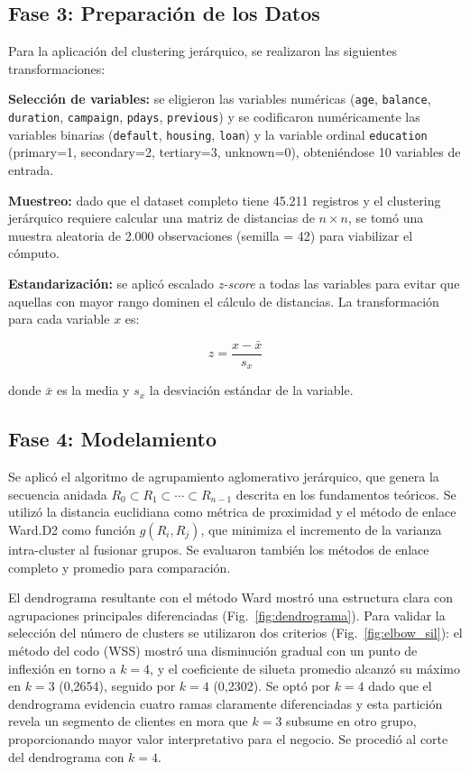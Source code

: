 \documentclass[10pt,a4paper]{article}
\begin{document}
\subsection{Fase 3: Preparación de los Datos}

Para la aplicación del clustering jerárquico, se realizaron las siguientes transformaciones:

\textbf{Selección de variables:} se eligieron las variables numéricas (\texttt{age}, \texttt{balance}, \texttt{duration}, \texttt{campaign}, \texttt{pdays}, \texttt{previous}) y se codificaron numéricamente las variables binarias (\texttt{default}, \texttt{housing}, \texttt{loan}) y la variable ordinal \texttt{education} (primary=1, secondary=2, tertiary=3, unknown=0), obteniéndose 10 variables de entrada.

\textbf{Muestreo:} dado que el dataset completo tiene 45.211 registros y el clustering jerárquico requiere calcular una matriz de distancias de $n \times n$, se tomó una muestra aleatoria de 2.000 observaciones (semilla = 42) para viabilizar el cómputo.

\textbf{Estandarización:} se aplicó escalado \textit{z-score} a todas las variables para evitar que aquellas con mayor rango dominen el cálculo de distancias. La transformación para cada variable $x$ es:

\begin{equation}
  z = \frac{x - \bar{x}}{s_x}
\end{equation}

donde $\bar{x}$ es la media y $s_x$ la desviación estándar de la variable.

\subsection{Fase 4: Modelamiento}

Se aplicó el algoritmo de agrupamiento aglomerativo jerárquico, que genera la secuencia anidada $R_0 \subset R_1 \subset \cdots \subset R_{n-1}$ descrita en los fundamentos teóricos. Se utilizó la distancia euclidiana como métrica de proximidad y el método de enlace Ward.D2 como función $g(R_i, R_j)$, que minimiza el incremento de la varianza intra-cluster al fusionar grupos. Se evaluaron también los métodos de enlace completo y promedio para comparación.

El dendrograma resultante con el método Ward mostró una estructura clara con agrupaciones principales diferenciadas (Fig.~\ref{fig:dendrograma}). Para validar la selección del número de clusters se utilizaron dos criterios (Fig.~\ref{fig:elbow_sil}): el método del codo (WSS) mostró una disminución gradual con un punto de inflexión en torno a $k = 4$, y el coeficiente de silueta promedio alcanzó su máximo en $k = 3$ (0,2654), seguido por $k = 4$ (0,2302). Se optó por $k = 4$ dado que el dendrograma evidencia cuatro ramas claramente diferenciadas y esta partición revela un segmento de clientes en mora que $k = 3$ subsume en otro grupo, proporcionando mayor valor interpretativo para el negocio. Se procedió al corte del dendrograma con $k = 4$.
\end{document}
